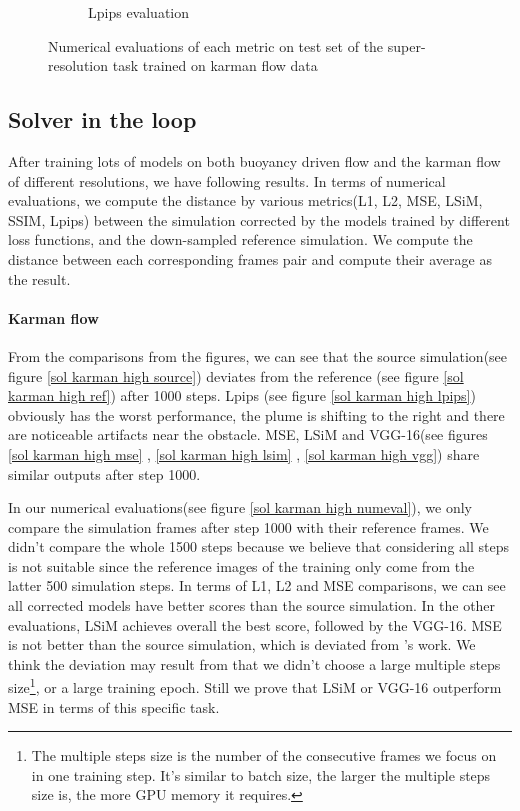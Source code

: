 \documentclass[a4paper,12pt,twoside]{report}
\begin{document}
\begin{figure}
\begin{subfigure}{0.32\textwidth}
		\caption{Lpips evaluation}
	\end{subfigure}
	\caption{Numerical evaluations of each metric on test set of the super-resolution task trained on karman flow data}
	\label{super karman numeval}
\end{figure}

\subsection{Solver in the loop}
After training lots of models on both buoyancy driven flow and the karman flow of different resolutions, we have following results. In terms of numerical evaluations, we compute the distance by various metrics(L1, L2, MSE, LSiM, SSIM, Lpips) between the simulation corrected by the models trained by different loss functions, and the down-sampled reference simulation. We compute the distance between each corresponding frames pair and compute their average as the result.

\paragraph{Karman flow}
From the comparisons from the figures, we can see that the source simulation(see figure \ref{sol karman high source}) deviates from the reference (see figure \ref{sol karman high ref}) after 1000 steps. Lpips (see figure \ref{sol karman high lpips}) obviously has the worst performance, the plume is shifting to the right and there are noticeable artifacts near the obstacle. MSE, LSiM and VGG-16(see figures \ref{sol karman high mse} , \ref{sol karman high lsim} , \ref{sol karman high vgg})  share similar outputs after step 1000.

In our numerical evaluations(see figure \ref{sol karman high numeval}), we only compare the simulation frames after step 1000 with their reference frames. We didn't compare the whole 1500 steps because we believe that considering all steps is not suitable since the reference images of the training only come from the latter 500 simulation steps. In terms of L1, L2 and MSE comparisons, we can see all corrected models have better scores than the source simulation. In the other evaluations, LSiM achieves overall the best score, followed by the VGG-16. MSE is not better than the source simulation, which is deviated from \citeauthor{um2020sol}'s work. We think the deviation may result from that we didn't choose a large multiple steps size\footnote{The multiple steps size is the number of the consecutive frames we focus on in one training step. It's similar to batch size, the larger the multiple steps size is, the more GPU memory it requires.}, or a large training epoch. Still we prove that LSiM or VGG-16 outperform MSE in terms of this specific task.
\end{document}
